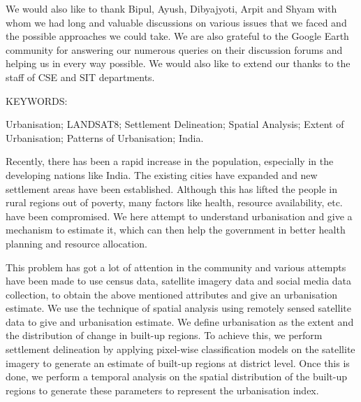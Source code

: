 \documentclass[Dual]{iitddiss}
\begin{document}
We would also like to thank Bipul, Ayush, Dibyajyoti, Arpit and Shyam with 
whom we had long and valuable discussions on various issues that we faced 
and the possible approaches we could take. We are also grateful to the Google 
Earth community for answering our numerous queries on their discussion forums
and helping us in every way possible. We would also like to extend our thanks 
to the staff of CSE and SIT departments.


\abstract

\noindent KEYWORDS: \hspace*{0.5em} \parbox[t]{4.4in}{Urbanisation; LANDSAT8;
  Settlement Delineation; Spatial Analysis; Extent of Urbanisation; Patterns of
  Urbanisation; India.}

\vspace*{24pt}

\noindent Recently, there has been a rapid increase in the population, 
especially in the developing nations like India. The existing cities have 
expanded and new settlement areas have been established. Although this has 
lifted the people in rural regions out of poverty, many factors like health, 
resource availability, etc. have been compromised. We here attempt to 
understand urbanisation and give a mechanism to estimate it, which can then 
help the government in better health planning and resource allocation.

This problem has got a lot of attention in the community and various attempts 
have been made to use census data, satellite imagery data and social media data 
collection, to obtain the above mentioned attributes and give an urbanisation 
estimate. We use the technique of spatial analysis using remotely sensed satellite 
data to give and urbanisation estimate. We define urbanisation as the extent and 
the distribution of change in built-up regions. To achieve this, we perform 
settlement delineation by applying pixel-wise classification models on the satellite 
imagery to generate an estimate of built-up regions at district level. Once this is 
done, we perform a temporal analysis on the spatial distribution of the built-up 
regions to generate these parameters to represent the urbanisation index.

\pagebreak


\begin{singlespace}
\tableofcontents
\thispagestyle{empty}

\end{singlespace}
\end{document}
